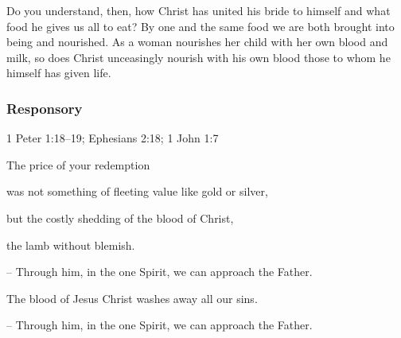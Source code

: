 Do you understand, then, how Christ has united his bride to himself and what food he gives us all to eat? By one and the same food we are both brought into being and nourished. As a woman nourishes her child with her own blood and milk, so does Christ unceasingly nourish with his own blood those to whom he himself has given life.

\subsubsection{Responsory}

\hfill 1 Peter 1:18--19; Ephesians 2:18; 1 John 1:7

The price of your redemption\par
was not something of fleeting value like gold or silver,\par
but the costly shedding of the blood of Christ,\par
the lamb without blemish.\par
– Through him, in the one Spirit, we can approach the Father.\par
\vspace{5pt}
The blood of Jesus Christ washes away all our sins.\par
– Through him, in the one Spirit, we can approach the Father.
